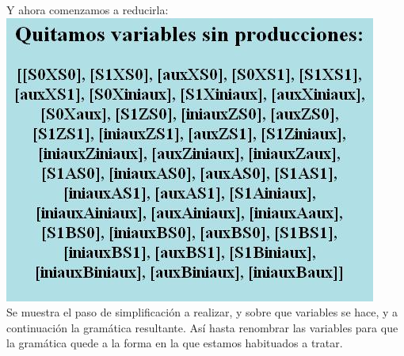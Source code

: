 \documentclass[12pt,a4paper,spanish]{book}
\begin{document}
Y ahora comenzamos a reducirla:\\
\includegraphics{detalle1simp.jpg}\\

Se muestra el paso de simplificaci\'on a realizar, y sobre que variables se hace, y a continuaci\'on la gram\'atica resultante. As\'i hasta renombrar las variables para que la gram\'atica quede a la forma en la que estamos habituados a tratar.



\end{document}
